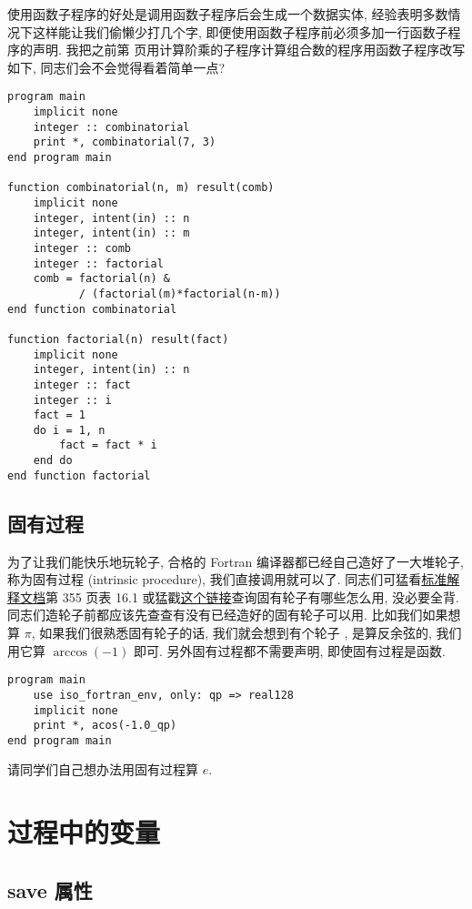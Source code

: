 使用函数子程序的好处是调用函数子程序后会生成一个数据实体, 经验表明多数情况下这样能让我们偷懒少打几个字, 即便使用函数子程序前必须多加一行函数子程序的声明. 我把之前第 \pageref{fact_comb} 页用计算阶乘的子程序计算组合数的程序用函数子程序改写如下, 同志们会不会觉得看着简单一点? 
\begin{lstlisting} 
program main
    implicit none
    integer :: combinatorial
    print *, combinatorial(7, 3)
end program main

function combinatorial(n, m) result(comb)
    implicit none
    integer, intent(in) :: n
    integer, intent(in) :: m
    integer :: comb
    integer :: factorial
    comb = factorial(n) &
           / (factorial(m)*factorial(n-m))
end function combinatorial

function factorial(n) result(fact)
    implicit none
    integer, intent(in) :: n
    integer :: fact
    integer :: i
    fact = 1
    do i = 1, n
        fact = fact * i
    end do
end function factorial
\end{lstlisting} 

\subsection{固有过程} 

\newcommand{\ip} [1]{\href{https://fortranwiki.org/fortran/show/#1} { \ttt{#1} } } 
为了让我们能快乐地玩轮子, 合格的 Fortran 编译器都已经自己造好了一大堆轮子, 称为固有过程 (intrinsic procedure), 我们直接调用就可以了. 同志们可猛看\href{https://j3-fortran.org/doc/year/24/24-007.pdf}{标准解释文档}第 355 页表 16.1 或猛戳\href{https://fortranwiki.org/fortran/show/Intrinsic+procedures}{这个链接}查询固有轮子有哪些怎么用, 没必要全背. 同志们造轮子前都应该先查查有没有已经造好的固有轮子可以用. 比如我们如果想算 $ \pi $, 如果我们很熟悉固有轮子的话, 我们就会想到有个轮子 , 是算反余弦的, 我们用它算 $ \arccos(-1) $ 即可. 另外固有过程都不需要声明, 即使固有过程是函数.
\begin{lstlisting} 
program main
    use iso_fortran_env, only: qp => real128
    implicit none
    print *, acos(-1.0_qp)
end program main
\end{lstlisting} 
请同学们自己想办法用固有过程算 $e$.

\section{过程中的变量}

\subsection{save 属性} 

